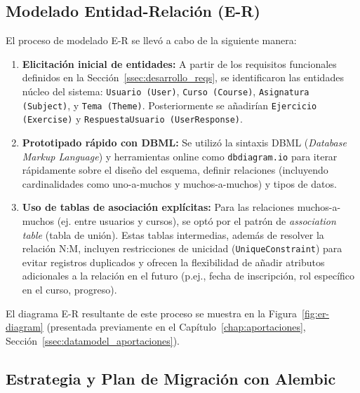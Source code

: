 \subsection{Modelado Entidad-Relación (E-R)}
\label{ssec:desarrollo_iter1_er}

El proceso de modelado E-R se llevó a cabo de la siguiente manera:
\begin{enumerate}[leftmargin=*]
  \item \textbf{Elicitación inicial de entidades:} A partir de los requisitos funcionales definidos en la Sección~\ref{ssec:desarrollo_reqs}, se identificaron las entidades núcleo del sistema: \texttt{Usuario (User)}, \texttt{Curso (Course)}, \texttt{Asignatura (Subject)}, y \texttt{Tema (Theme)}. Posteriormente se añadirían \texttt{Ejercicio (Exercise)} y \texttt{RespuestaUsuario (UserResponse)}.
  \item \textbf{Prototipado rápido con DBML:} Se utilizó la sintaxis DBML (\textit{Database Markup Language}) y herramientas online como \texttt{dbdiagram.io} para iterar rápidamente sobre el diseño del esquema, definir relaciones (incluyendo cardinalidades como uno-a-muchos y muchos-a-muchos) y tipos de datos.
  \item \textbf{Uso de tablas de asociación explícitas:} Para las relaciones muchos-a-muchos (ej. entre usuarios y cursos), se optó por el patrón de \emph{association table} (tabla de unión). Estas tablas intermedias, además de resolver la relación N:M, incluyen restricciones de unicidad (\texttt{UniqueConstraint}) para evitar registros duplicados y ofrecen la flexibilidad de añadir atributos adicionales a la relación en el futuro (p.ej., fecha de inscripción, rol específico en el curso, progreso).
\end{enumerate}

El diagrama E-R resultante de este proceso se muestra en la Figura~\ref{fig:er-diagram} (presentada previamente en el Capítulo~\ref{chap:aportaciones}, Sección~\ref{ssec:datamodel_aportaciones}).

\subsection{Estrategia y Plan de Migración con Alembic}
\label{ssec:desarrollo_iter1_migracion}

